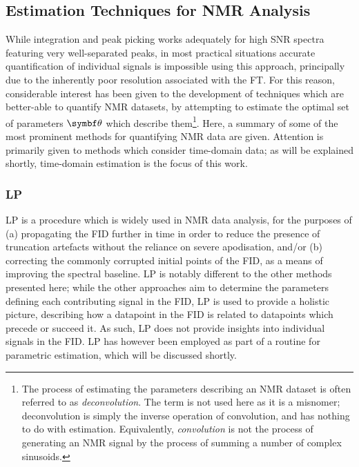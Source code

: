 \subsection{Estimation Techniques for NMR Analysis}
\label{subsec:estimation-techniques}
While integration and peak picking works adequately for high \ac{SNR} spectra
featuring very well-separated peaks, in most practical situations accurate
quantification of individual signals is impossible using this approach,
principally due to the inherently poor resolution associated with the
\ac{FT}.
For this reason, considerable interest has been given to the development of
techniques which are better-able to quantify \ac{NMR} datasets, by attempting
to estimate the optimal set of parameters $\bth$ which describe them\footnote{
    The process of estimating the parameters describing an \ac{NMR}
    dataset is often referred to as \emph{deconvolution}. The term is not used
    here as it is a misnomer; deconvolution is simply the inverse operation of
    convolution, and has nothing to do with estimation. Equivalently,
    \emph{convolution} is not the process of generating an \ac{NMR}
    signal by the process of summing a number of complex sinusoids.
}.
Here, a summary of some of the most prominent methods for quantifying \ac{NMR}
data are given. Attention is primarily given to methods which consider
time-domain data; as will be explained shortly, time-domain estimation is the
focus of this work.

\subsubsection{\Acl{LP}}
\Ac{LP}\cite{Stephenson1988,Koehl1999,Marion1989b,Zhu1992} is a procedure which
is widely used in \ac{NMR} data analysis, for the purposes of (a) propagating
the \ac{FID} further in time in order to reduce the presence of truncation
artefacts without the reliance on severe apodisation, and/or (b) correcting the
commonly corrupted initial points of the \ac{FID}, as a means of improving the
spectral baseline. \ac{LP} is notably different to the other methods presented
here; while the other approaches aim to determine the parameters defining each
contributing signal in the \ac{FID}, \ac{LP} is used to provide a holistic
picture, describing how a datapoint in the \ac{FID} is related to datapoints
which precede or succeed it.  As such, \ac{LP} does not provide insights into
individual signals in the \ac{FID}. \ac{LP} has however been employed as part
of a routine for parametric estimation, which will be discussed shortly.

